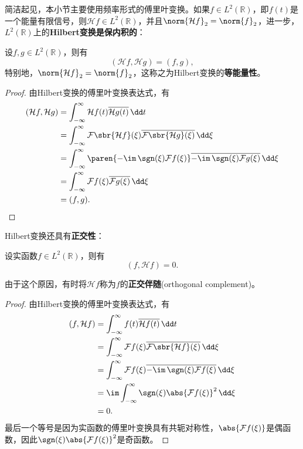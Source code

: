 简洁起见，本小节主要使用频率形式的傅里叶变换。如果$f\in L^2(\mathbb{R})$，即$f(t)$是一个能量有限信号，则$\mathcal{H}f\in L^2(\mathbb{R})$，并且$\norm{\mathcal{H}f}_2=\norm{f}_2$，进一步，$L^2(\mathbb{R})$上的\textbf{Hilbert变换是保内积的}：
\begin{theorem}
    设$f,g\in L^2(\mathbb{R})$，则有
    \begin{equation}
        (\mathcal{H}f,\mathcal{H}g)=(f,g),
    \end{equation}
    特别地，$\norm{\mathcal{H}f}_2=\norm{f}_2$，这称之为Hilbert变换的\textbf{等能量性}。
\end{theorem}
\begin{proof}
    由Hilbert变换的傅里叶变换表达式，有
    \begin{align}
        (\mathcal{H}f,\mathcal{H}g)&=\int_{-\infty}^{\infty}\mathcal{H}f(t)\overline{\mathcal{H}g(t)}\,\dd t\nonumber\\
        &=\int_{-\infty}^{\infty}\mathcal{F}\sbr{\mathcal{H}f}(\xi)\overline{\mathcal{F}\sbr{\mathcal{H}g}(\xi)}\,\dd\xi\nonumber\\
        &=\int_{-\infty}^{\infty}\paren{-\im\,\sgn(\xi)\mathcal{F}f(\xi)}\overline{-\im\,\sgn(\xi)\mathcal{F}g(\xi)}\,\dd\xi\nonumber\\
        &=\int_{-\infty}^{\infty}\mathcal{F}f(\xi)\overline{\mathcal{F}g(\xi)}\,\dd\xi\nonumber\\
        &=(f,g).
    \end{align}
\end{proof}

Hilbert变换还具有\textbf{正交性}：
\begin{theorem}
    设实函数$f\in L^2(\mathbb{R})$，则有
    \begin{equation}
        (f,\mathcal{H}f)=0.
    \end{equation}
\end{theorem}
由于这个原因，有时将$\mathcal{H}f$称为$f$的\textbf{正交伴随}(orthogonal complement)。
\begin{proof}
    由Hilbert变换的傅里叶变换表达式，有
    \begin{align}
        (f,\mathcal{H}f)&=\int_{-\infty}^{\infty}f(t)\overline{\mathcal{H}f(t)}\,\dd t\nonumber\\
        &=\int_{-\infty}^{\infty}\mathcal{F}f(\xi)\overline{\mathcal{F}\sbr{\mathcal{H}f}(\xi)}\,\dd\xi\nonumber\\
        &=\int_{-\infty}^{\infty}\mathcal{F}f(\xi)\overline{-\im\,\sgn(\xi)\mathcal{F}f(\xi)}\,\dd\xi\nonumber\\
        &=\im\int_{-\infty}^{\infty}\sgn(\xi)\abs{\mathcal{F}f(\xi)}^2\,\dd\xi\nonumber\\
        &=0.
    \end{align}
    最后一个等号是因为实函数的傅里叶变换具有共轭对称性，$\abs{\mathcal{F}f(\xi)}$是偶函数，因此$\sgn(\xi)\abs{\mathcal{F}f(\xi)}^2$是奇函数。
\end{proof}

